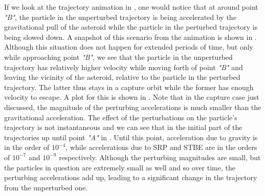 \FloatBarrier
If we look at the trajectory animation in , one would notice that at around point \textit{"B"}, the particle in the unperturbed trajectory is being accelerated by the gravitational pull of the asteroid while the particle in the perturbed trajectory is being slowed down. A snapshot of this scenario from the animation is shown in . Although this situation does not happen for extended periods of time, but only while approaching point \textit{"B"}, we see that the particle in the unperturbed trajectory has relatively higher velocity while moving forth of point \textit{"B"} and leaving the vicinity of the asteroid, relative to the particle in the perturbed trajectory. The latter thus stays in a capture orbit while the former has enough velocity to escape. A plot for this is shown in .
%
\newline\newline
%
Note that in the capture case just discussed, the magnitude of the perturbing accelerations is much smaller than the gravitational acceleration. The effect of the perturbations on the particle's trajectory is not instantaneous and we can see that in the initial part of the trajectories up until point \textit{"A"} in . Until this point, acceleration due to gravity is in the order of $10^{-4}$, while accelerations due to \gls{SRP} and \gls{STBE} are in the orders of $10^{-7}$ and $10^{-9}$ respectively. Although the perturbing magnitudes are small, but the particles in question are extremely small as well and so over time, the perturbing accelerations add up, leading to a significant change in the trajectory from the unperturbed one.
